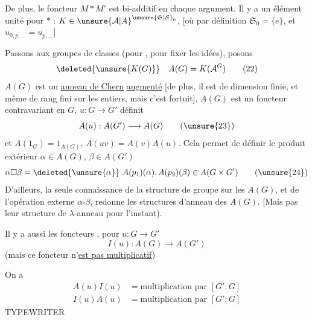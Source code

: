 De plus, le foncteur $M*M'$ est bi-additif en chaque
argument. Il y a un élément unité pour $*$ :
$K\in{\unsure{\mathcal A|A}}^{\unsure{\mathfrak S|\mathcal S}_0}$,  [où par définition $\mathfrak S_0=\{e\}$, et $u_{0,p,\ldots}=u_{p,\ldots}$]

Passons aux groupes de classes (pour ,
pour fixer les idées), posons
\[
\deleted{\unsure{K(G)}}\quad A(G)=K(\mathcal A^G) \tag*{(22)}
\]
$A(G)$ est un  \uline{anneau de Chern}
\uline{} \uline{augmenté} [de plus, il est de dimension
finie, et même de rang fini sur les entiers, mais
c'est fortuit], $A(G)$ est un foncteur
 contravariant en $G$, $u:G\longrightarrow G'$ définit
\[
A(u):A(G')\longrightarrow A(G) \tag*{(\unsure{23})}
\]
et $A(1_G)=1_{A(G)}$, $A(uv)=A(v)A(u)$. Cela permet de
définir le produit extérieur $\alpha\in A(G)$, $\beta\in A(G')$
\[
\alpha\square\beta=\deleted{\unsure{\alpha}}\ A(p_1)(\alpha).\,A(p_2)(\beta)\in A(G\times G') \tag*{(\unsure{24})}
\]
D'ailleurs, la seule connaissance de la structure de
groupe sur les $A(G)$, et de l'opération externe
$\alpha\square\beta$, redonne les structures d'anneau  des $A(G)$.
[Mais pas leur structure de $\lambda$-anneau pour l'instant).

Il y a aussi les foncteurs , pour $u:G\longrightarrow G'$
\[
I(u):A(G)\longrightarrow A(G') \tag*{(25)}
\]
(mais ce foncteur n'\uline{est pas multiplicatif})

On a
\[
\begin{aligned}
A(u)I(u)&=\text{multiplication par }[G':G]\\
I(u)A(u)&=\text{multiplication par }[G':G]
\end{aligned}\tag*{(26)}
\]
  TYPEWRITER  
